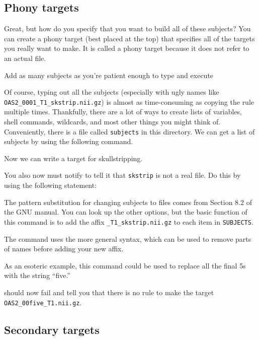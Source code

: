 \subsection{Phony targets}

Great, but how do you specify that you want to build all of these
subjects? You can create a phony target (best placed at the top) that
specifies all of the targets you really want to make. It is called a
phony target because it does not refer to an actual file.

Add as many subjects as you're patient enough to type and execute

Of course, typing out all the subjects (especially with ugly names
like \texttt{OAS2_0001_T1_skstrip.nii.gz}) is almost as time-consuming
as copying the rule multiple times. Thankfully, there are a lot of
ways to create lists of variables, shell commands, wildcards, and most
other things you might think of. Conveniently, there is a file called
\texttt{subjects} in this directory. We can get a list of subjects by
using the following \maken{} command.  

Now we can write a target for skullstripping.

You also now must notify \maken{} to tell it that \texttt{skstrip} is not a real  file. Do this by using the following statement:

The pattern substitution for changing subjects to files comes from Section 8.2 of the GNU \maken{} manual. You can look up the other options, but the basic function of this command is to add the affix \texttt{_T1_skstrip.nii.gz} to each item in \texttt{SUBJECTS}. 

The command uses the more general syntax, which can be used to remove parts of names before adding your new affix.

As an esoteric example, this command could be used to replace all the final 5s with the string ``five.''

\maken{} should now fail and tell you that there is no rule to make the target \texttt{OAS2_00five_T1.nii.gz}.

\subsection{Secondary targets}

